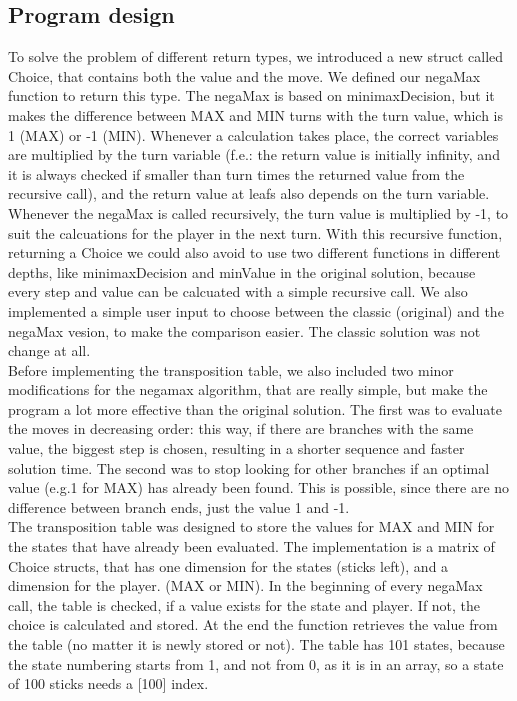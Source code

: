 \documentclass{article}
\begin{document}
\subsection*{Program design}
To solve the problem of different return types, we introduced a new struct called Choice, that contains both the value and the move. We defined our negaMax function to return this type. The negaMax is based on minimaxDecision, but it makes the difference between MAX and MIN turns with the turn value, which is 1 (MAX) or -1 (MIN). Whenever a calculation takes place, the correct variables are multiplied by the turn variable (f.e.: the return value is initially infinity, and it is always checked if smaller than turn times the returned value from the recursive call), and the return value at leafs also depends on the turn variable. Whenever the negaMax is called recursively, the turn value is multiplied by -1, to suit the calcuations for the player in the next turn. With this recursive function, returning a Choice we could also avoid to use two different functions in different depths, like minimaxDecision and minValue in the original solution, because every step and value can be calcuated with a simple recursive call. We also implemented a simple user input to choose between the classic (original) and the negaMax vesion, to make the comparison easier. The classic solution was not change at all. \\
Before implementing the transposition table, we also included two minor modifications for the negamax algorithm, that are really simple, but make the program a lot more effective than the original solution. The first was to evaluate the moves in decreasing order: this way, if there are branches with the same value, the biggest step is chosen, resulting in a shorter sequence and faster solution time. The second was to stop looking for other branches if an optimal value (e.g.1 for MAX) has already been found. This is possible, since there are no difference between branch ends, just the value 1 and -1.\\
The transposition table was designed to store the values for MAX and MIN for the states that have already been evaluated. The implementation is a matrix of Choice structs, that has one dimension for the states (sticks left), and a dimension for the player. (MAX or MIN). In the beginning of every negaMax call, the table is checked, if a value exists for the state and player. If not, the choice is calculated and stored. At the end the function retrieves the value from the table (no matter it is newly stored or not). The table has 101 states, because the state numbering starts from 1, and not from 0, as it is in an array, so a state of 100 sticks needs a [100] index.
\end{document}
